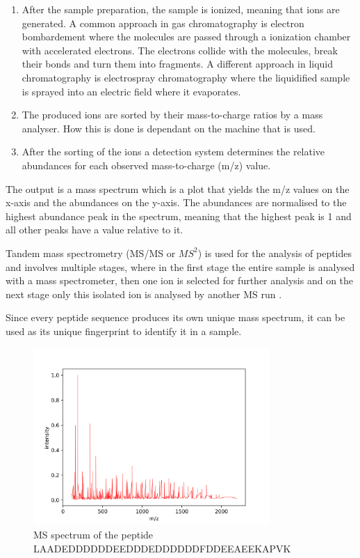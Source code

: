 \documentclass[12pt]{article}
\begin{document}
\begin{enumerate}
\item After the sample preparation, the sample is ionized, meaning that ions are generated. A common approach in gas chromatography is electron bombardement where the molecules are passed through a ionization chamber with accelerated electrons. The electrons collide with the molecules, break their bonds and turn them into fragments. A different approach in liquid
chromatography is electrospray chromatography where the liquidified sample is sprayed into an electric field where it evaporates.
\item The produced ions are sorted by their mass-to-charge ratios by a mass analyser. How this is done is dependant on the machine that is used.
\item After the sorting of the ions a detection system determines the relative abundances for each observed mass-to-charge (m/z) value.
\end{enumerate} 

The output is a mass spectrum which is a plot that yields the m/z values on the x-axis and the abundances on the y-axis. The abundances are normalised to the highest abundance peak in the spectrum, meaning that the highest peak is 1 and all other peaks have a value relative to it. 

Tandem mass spectrometry (MS/MS or \(MS^2\)) is used for the analysis of peptides and involves multiple stages, where in the first stage the entire sample is analysed with a mass spectrometer, then one ion is selected for further analysis and on the next stage only this isolated ion is analysed by another MS run \cite{tandem-mass-spectrometry}. 

Since every peptide sequence produces its own unique mass spectrum, it can be used as its unique fingerprint to identify it in a sample. 
\begin{figure}[ht]
    \centering
    \includegraphics[width=0.8\textwidth]{figs/peptide.png}
    \caption{MS spectrum of the peptide LAADEDDDDDDEEDDDEDDDDDDFDDEEAEEKAPVK}
    \label{fig:peptide}
\end{figure}
\end{document}
